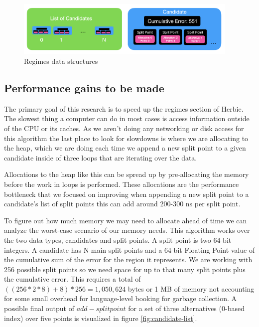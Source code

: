 \documentclass{article}
\begin{document}
\begin{figure}[htbp]
\begin{center}
\includegraphics[width=0.95\textwidth]{candidates.png}
\caption{Regimes data structures}
\label{fig:candidates}
\end{center}
\end{figure}

\subsection{Performance gains to be made}
The primary goal of this research is to speed up the regimes section of Herbie. The slowest thing a computer can do in most cases is access information outside of the CPU or its caches. As we aren't doing any networking or disk access for this algorithm the last place to look for slowdowns is where we are allocating to the heap, which we are doing each time we append a new split point to a given candidate inside of three loops that are iterating over the data. 

Allocations to the heap like this can be spread up by pre-allocating the memory before the work in loops is performed. These allocations are the performance bottleneck that we focused on improving when appending a new split point to a candidate's list of split points this can add around 200-300 ns per split point.

To figure out how much memory we may need to allocate ahead of time we can analyze the worst-case scenario of our memory needs. This algorithm works over the two data types, candidates and split points. A split point is two 64-bit integers. A candidate has N main split points and a 64-bit Floating Point value of the cumulative sum of the error for the region it represents. We are working with 256 possible split points so we need space for up to that many split points plus the cumulative error. This requires a total of  $((256 * 2 *8) + 8) * 256 = 1,050,624$ bytes or 1 MB of memory not accounting for some small overhead for language-level booking for garbage collection. A possible final output of  $add-splitpoint$ for a set of three alternatives (0-based index) over five points is visualized in figure \ref{fig:candidate-list}.
\end{document}
